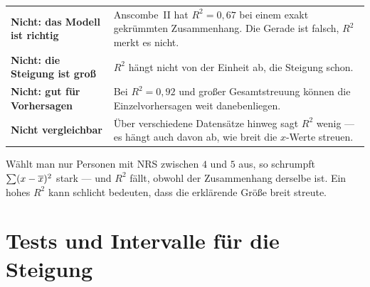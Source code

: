 \begin{warnung}
\begin{center}
{\small
\renewcommand{\arraystretch}{1.52}
\begin{tabular}{@{}P{2.4cm}P{6.2cm}@{}}
\toprule
\textbf{Nicht: das Modell ist richtig} & Anscombe~II hat $R^2 = 0{,}67$ bei einem exakt gekrümmten Zusammenhang. Die Gerade ist falsch, $R^2$ merkt es nicht.\\
\textbf{Nicht: die Steigung ist groß} & $R^2$ hängt nicht von der Einheit ab, die Steigung schon.\\
\textbf{Nicht: gut für Vorhersagen} & Bei $R^2 = 0{,}92$ und großer Gesamtstreuung können die Einzelvorhersagen weit danebenliegen.\\
\textbf{Nicht vergleichbar} & Über verschiedene Datensätze hinweg sagt $R^2$ wenig --- es hängt auch davon ab, wie breit die $x$-Werte streuen.\\
\bottomrule
\end{tabular}}
\end{center}

Wählt man nur Personen mit NRS zwischen $4$ und $5$ aus, so schrumpft $\sum(x-\overline{x})^2$ stark --- und $R^2$ fällt, obwohl der Zusammenhang derselbe ist. Ein hohes $R^2$ kann schlicht bedeuten, dass die erklärende Größe breit streute.
\end{warnung}

\section{Tests und Intervalle für die Steigung}

